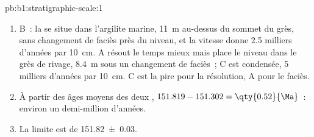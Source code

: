 \begin{solution}{pb:b1:stratigraphic-scale:1}
\begin{enumerate}
        se compactent différemment (\cref{ch:b1:diagenesis-basins}). Si le sable
        s'est accumulé plus vite, la partie gréseuse contient moins de temps que son
        épaisseur ne le suggère, et la  est plus ancienne que calculée
        --- l'âge de A est bien le plus ancien des trois.
  \item B~: la  se situe dans l'argilite marine, \qty{11}{m} au-dessus du
        sommet du grès, sans changement de faciès près du niveau, et la
        vitesse donne \num{2.5} milliers d'années par \qty{10}{cm}. A résout le temps
        mieux mais place le niveau dans le grès de rivage, \qty{8.4}{m}
        sous un changement de faciès~; C est condensée, \num{5} milliers d'années par
        \qty{10}{cm}. C est la pire pour la résolution, A pour le faciès.
  \item À partir des âges moyens des deux , $151.819 - 151.302 =
        \qty{0.52}{\Ma}$~: environ un demi-million d'années.
  \item La limite est de \qty[uncertainty-mode=separate]{151.82(3)}{\Ma}.
\end{enumerate}
\end{solution}
